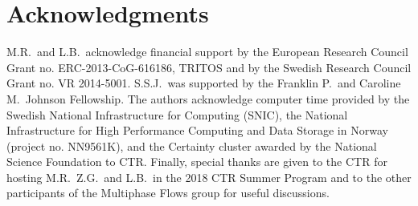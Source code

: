 \section*{Acknowledgments}
M.R.\ and L.B.\ acknowledge financial support by the European Research Council Grant no. ERC-2013-CoG-616186, TRITOS and by the Swedish Research Council Grant no. VR 2014-5001. S.S.J.\ was supported by the Franklin P.\ and Caroline M.\ Johnson Fellowship. The authors acknowledge computer time provided by the Swedish National Infrastructure for Computing (SNIC), the National Infrastructure for High Performance Computing and Data Storage in Norway (project no. NN9561K), and the Certainty cluster awarded by the National Science Foundation to CTR. Finally, special thanks are given to the CTR for hosting M.R.\, Z.G.\ and L.B.\ in the 2018 CTR Summer Program and to the other participants of the Multiphase Flows group for useful discussions.


